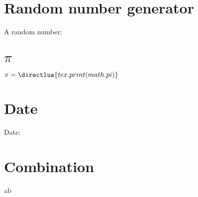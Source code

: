 \documentclass{article}
\begin{document}
 
    \section*{Random number generator}
    
        A random number:
        
        \section*{$\pi$}
        
        $\pi = \directlua{tex.print(math.pi)}$
    
    \section*{Date}
    
        Date:
    
    \section*{Combination}
    
        ab
 
\end{document}
